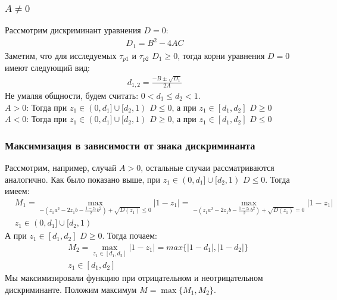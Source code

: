 \documentclass[a4paper]{article}
\begin{document}
\subsubsection{$A \neq 0$}
Рассмотрим дискриминант уравнения $D = 0$:
\begin{equation}
 \begin{aligned}
D_1 = B^2 - 4AC
 \end{aligned}
\end{equation}
Заметим, что для исследуемых $\tau_{p1}$ и $\tau_{p2}$ $D_1 \geq 0$, тогда корни уравнения $D = 0$ имеют следующий вид:
\begin{equation}
 \begin{aligned}
d_{1,2} = \frac{-B\pm\sqrt{D_1}}{2A}
 \end{aligned}
\end{equation}
Не умаляя общности, будем считать: $0 < d_1 \leq d_2 <1$. \\
$A > 0$: Тогда при $z_1 \in (0, d_1] \cup [d_2, 1)$ $D \leq 0$, а при $z_1 \in [d_1, d_2]$ $D \geq 0$\\
$A < 0$: Тогда при $z_1 \in (0, d_1] \cup [d_2, 1)$ $D \geq 0$, а при $z_1 \in [d_1, d_2]$ $D \leq 0$

\subsubsection{Максимизация в зависимости от знака дискриминанта}
Рассмотрим, например, случай $A > 0$, остальные случаи рассматриваются аналогично. Как было показано выше, при $z_1 \in (0, d_1] \cup [d_2, 1)$ $D \leq 0$. Тогда имеем:
\begin{equation}
 \begin{aligned}
&M_1 = \max\limits_{-(z_1 a^2-2 z_1 b - \frac{1-z_1}{2} b^2)+\sqrt{D(z_1)}  \leq 0  }{|1-z_1|} = \max\limits_{-(z_1 a^2-2 z_1 b - \frac{1-z_1}{2} b^2)+\sqrt{D(z_1)}  = 0  }{|1-z_1|}\\
&z_1\in(0, d_1]\cup[d_2, 1)
 \end{aligned}
\end{equation} 
А при $z_1 \in [d_1, d_2]$ $D \geq 0$. Тогда почаем:
\begin{equation}
 \begin{aligned}
&M_2 = \max\limits_{z_1\in[d_1, d_2]}{|1-z_1|} = max\{|1-d_1|, |1-d_2|\}\\
&z_1\in[d_1, d_2]
 \end{aligned}
\end{equation}
Мы максимизировали функцию при отрицательном и неотрицательном дискриминанте. Положим максимум $M = \max \{M_1, M_2\}$. 
\end{document}
